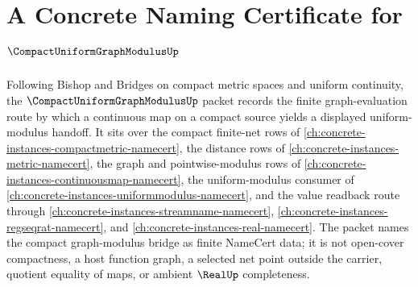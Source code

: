 \chapter{A Concrete Naming Certificate for $\CompactUniformGraphModulusUp$}
\label{ch:concrete-instances-compact-uniform-graph-modulus-namecert}

Following Bishop and Bridges on compact metric spaces and uniform continuity, the $\CompactUniformGraphModulusUp$ packet records the finite graph-evaluation route by which a continuous map on a compact source yields a displayed uniform-modulus handoff. It sits over the compact finite-net rows of \autoref{ch:concrete-instances-compactmetric-namecert}, the distance rows of \autoref{ch:concrete-instances-metric-namecert}, the graph and pointwise-modulus rows of \autoref{ch:concrete-instances-continuousmap-namecert}, the uniform-modulus consumer of \autoref{ch:concrete-instances-uniformmodulus-namecert}, and the value readback route through \autoref{ch:concrete-instances-streamname-namecert}, \autoref{ch:concrete-instances-regseqrat-namecert}, and \autoref{ch:concrete-instances-real-namecert}. The packet names the compact graph-modulus bridge as finite NameCert data; it is not open-cover compactness, a host function graph, a selected net point outside the carrier, quotient equality of maps, or ambient $\RealUp$ completeness.

